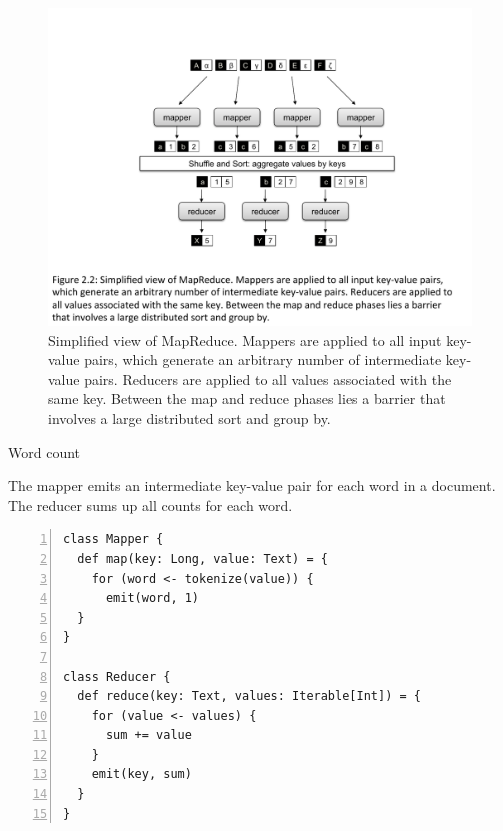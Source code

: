 \begin{figure}
\begin{center}
\includegraphics[scale=0.6]{figures/fig-ch2-MapReduce-simple.pdf}
\end{center}
\caption{Simplified view of MapReduce.  Mappers are applied to all
  input key-value pairs, which generate an arbitrary number of
  intermediate key-value pairs.  Reducers are applied to all values
  associated with the same key.  Between the map and reduce phases
  lies a barrier that involves a large distributed sort and group by.}
\label{figure:chapter2:MapReduce-simple}
\end{figure}


\begin{algorithm}[t]
\caption{Word count}
\label{algorithm:chapter2:word-count:basic}
The mapper emits an intermediate key-value pair for each word in a
document. The reducer sums up all counts for each word.
\begin{small}
\begin{Verbatim}[numbers=left, xleftmargin=7.5mm]
class Mapper {
  def map(key: Long, value: Text) = {
    for (word <- tokenize(value)) {
      emit(word, 1)
  }
}

class Reducer {
  def reduce(key: Text, values: Iterable[Int]) = {
    for (value <- values) {
      sum += value
    }
    emit(key, sum)
  }
}
\end{Verbatim}
\end{small}
\end{algorithm}

